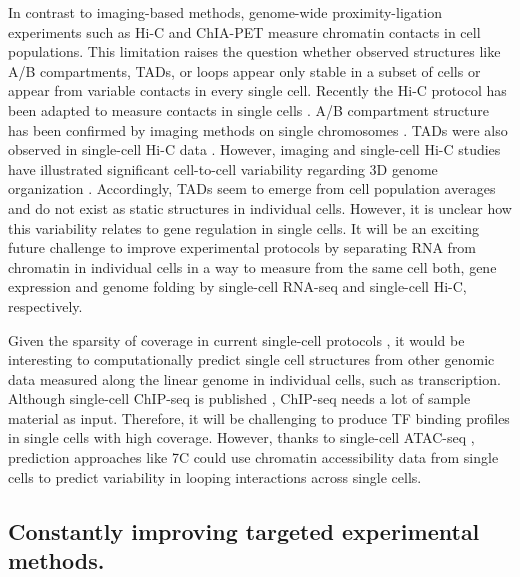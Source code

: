 \documentclass[a4paper,twoside=true,openright,parskip=full,chapterprefix=true,11pt,headings=normal,bibliography=totoc,listof=totoc,titlepage=on,captions=tableabove,draft=false]{scrreprt}
\theoremstyle{definition}
\theoremstyle{definition}
\theoremstyle{definition}
\theoremstyle{remark}
\begin{document}
In contrast to imaging-based methods, genome-wide proximity-ligation
experiments such as Hi-C and ChIA-PET measure chromatin contacts in cell
populations. This limitation raises the question whether observed
structures like A/B compartments, TADs, or loops appear only stable in a
subset of cells or appear from variable contacts in every single cell.
Recently the Hi-C protocol has been adapted to measure contacts in
single cells \citep{Sekelja2016, Ulianov2017}. A/B compartment structure
has been confirmed by imaging methods on single chromosomes
\citep{Wang2016d}. TADs were also observed in single-cell Hi-C data
\citep{Nagano2013}. However, imaging and single-cell Hi-C studies have
illustrated significant cell-to-cell variability regarding 3D genome
organization \citep{Nagano2013, Ramani2016, Flyamer2017, Stevens2017}.
Accordingly, TADs seem to emerge from cell population averages and do
not exist as static structures in individual cells. However, it is
unclear how this variability relates to gene regulation in single cells.
It will be an exciting future challenge to improve experimental
protocols by separating RNA from chromatin in individual cells in a way
to measure from the same cell both, gene expression and genome folding
by single-cell RNA-seq and single-cell Hi-C, respectively.

Given the sparsity of coverage in current single-cell protocols
\citep{Nagano2013, Flyamer2017, Stevens2017}, it would be interesting to
computationally predict single cell structures from other genomic data
measured along the linear genome in individual cells, such as
transcription. Although single-cell ChIP-seq is published
\citep{Rotem2015}, ChIP-seq needs a lot of sample material as input.
Therefore, it will be challenging to produce TF binding profiles in
single cells with high coverage. However, thanks to single-cell ATAC-seq
\citep{Buenrostro2015}, prediction approaches like 7C could use
chromatin accessibility data from single cells to predict variability in
looping interactions across single cells.

\hypertarget{constantly-improving-targeted-experimental-methods.}{%
\subsection{Constantly improving targeted experimental
methods.}\label{constantly-improving-targeted-experimental-methods.}}
\end{document}

